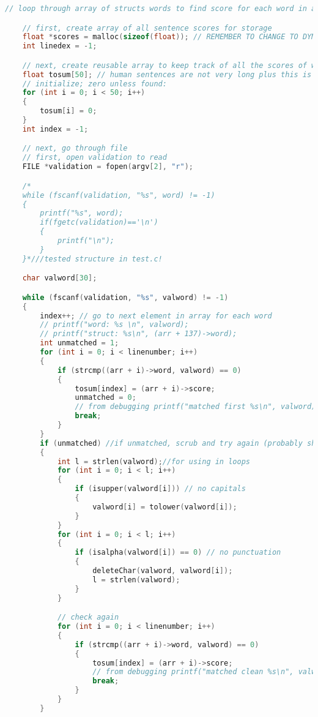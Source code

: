 \documentclass{article}
\begin{document}
\begin{lstlisting}[language=C, caption=main.c]
    // loop through array of structs words to find score for each word in a sentence, calculate average for sentence

    // first, create array of all sentence scores for storage
    float *scores = malloc(sizeof(float)); // REMEMBER TO CHANGE TO DYM AND ADD REALLOC BELOW
    int linedex = -1;

    // next, create reusable array to keep track of all the scores of words in a sentence before averaging
    float tosum[50]; // human sentences are not very long plus this is for reusing, so i chose stack
    // initialize; zero unless found:
    for (int i = 0; i < 50; i++)
    {
        tosum[i] = 0;
    }
    int index = -1;

    // next, go through file
    // first, open validation to read
    FILE *validation = fopen(argv[2], "r");

    /*
    while (fscanf(validation, "%s", word) != -1)
    {
        printf("%s", word);
        if(fgetc(validation)=='\n')
        {
            printf("\n");
        }
    }*///tested structure in test.c!

    char valword[30];

    while (fscanf(validation, "%s", valword) != -1)
    {
        index++; // go to next element in array for each word
        // printf("word: %s \n", valword);
        // printf("struct: %s\n", (arr + 137)->word);
        int unmatched = 1;
        for (int i = 0; i < linenumber; i++)
        {
            if (strcmp((arr + i)->word, valword) == 0)
            {
                tosum[index] = (arr + i)->score;
                unmatched = 0;
                // from debugging printf("matched first %s\n", valword);
                break;
            }
        }
        if (unmatched) //if unmatched, scrub and try again (probably should've put the rest in some functions honestly but eh)
        {
            int l = strlen(valword);//for using in loops
            for (int i = 0; i < l; i++)
            {
                if (isupper(valword[i])) // no capitals
                {
                    valword[i] = tolower(valword[i]);
                }
            }
            for (int i = 0; i < l; i++)
            {
                if (isalpha(valword[i]) == 0) // no punctuation
                {
                    deleteChar(valword, valword[i]);
                    l = strlen(valword);
                }
            }

            // check again
            for (int i = 0; i < linenumber; i++)
            {
                if (strcmp((arr + i)->word, valword) == 0)
                {
                    tosum[index] = (arr + i)->score;
                    // from debugging printf("matched clean %s\n", valword);
                    break;
                }
            }
        }


\end{lstlisting}
\end{document}
